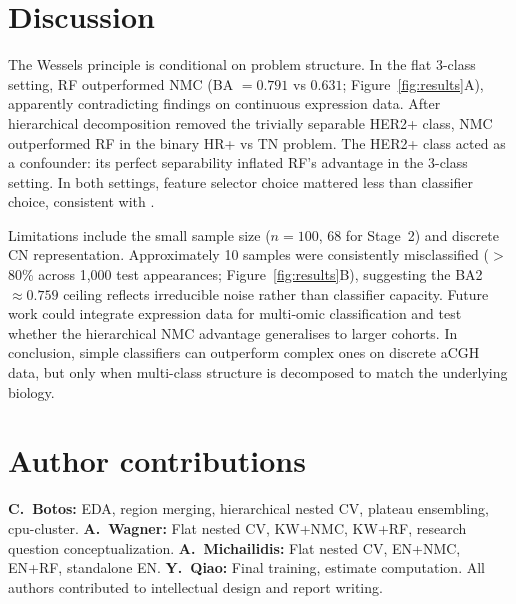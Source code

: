 \documentclass[11pt,a4paper,twocolumn]{article}
\begin{document}
\section{Discussion}
\label{sec:discussion}

The Wessels principle is conditional on problem structure. In the flat 3-class setting, RF outperformed NMC (BA $= 0.791$ vs $0.631$; Figure~\ref{fig:results}A), apparently contradicting findings on continuous expression data. After hierarchical decomposition removed the trivially separable HER2+ class, NMC outperformed RF in the binary HR+ vs TN problem. The HER2+ class acted as a confounder: its perfect separability inflated RF's advantage in the 3-class setting. In both settings, feature selector choice mattered less than classifier choice, consistent with \citet{wessels2005protocol}.

Limitations include the small sample size ($n = 100$, 68 for Stage~2) and discrete CN representation. Approximately 10 samples were consistently misclassified ($>$80\% across 1,000 test appearances; Figure~\ref{fig:results}B), suggesting the BA2 $\approx 0.759$ ceiling reflects irreducible noise rather than classifier capacity. Future work could integrate expression data for multi-omic classification and test whether the hierarchical NMC advantage generalises to larger cohorts. In conclusion, simple classifiers can outperform complex ones on discrete aCGH data, but only when multi-class structure is decomposed to match the underlying biology.

\section*{Author contributions}

{\small
\textbf{C.~Botos:} EDA, region merging, hierarchical nested CV, plateau ensembling, cpu-cluster.
\textbf{A.~Wagner:} Flat nested CV, KW+NMC, KW+RF, research question conceptualization.
\textbf{A.~Michailidis:} Flat nested CV, EN+NMC, EN+RF, standalone EN.
\textbf{Y.~Qiao:} Final training, estimate computation.
All authors contributed to intellectual design and report writing.
}


\end{document}
